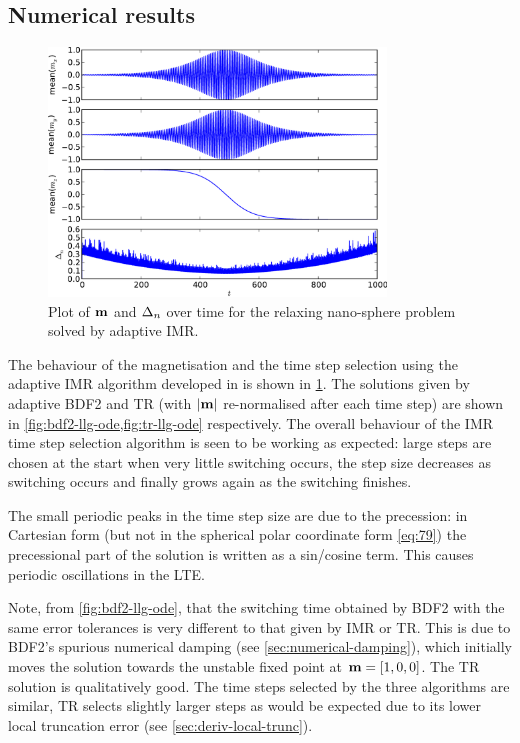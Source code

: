 \subsection{Numerical results}
\label{sec:aimr-llgode-numerical-results}

\begin{figure}
  \centering
  \includegraphics[width=0.8\textwidth]{plots/aimr-sphere-relax/imr0-meanmxsvs-meanmysvs-meanmzsvs-dtsvstimes.pdf}
  \caption{Plot of $\boldsymbol{\mathrm{m}}$ and $\Delta_{n}$ over time for the relaxing nano-sphere problem solved by adaptive IMR.}
  \label{fig:imr-llg-ode}
\end{figure}

The behaviour of the magnetisation and the time step selection using the adaptive IMR algorithm developed in  is shown in \cref{fig:imr-llg-ode}.
The solutions given by adaptive BDF2 and TR (with $\left|{\boldsymbol{\mathrm{m}}} \right|$ re-normalised after each time step)  are shown in \cref{fig:bdf2-llg-ode,fig:tr-llg-ode} respectively.
The overall behaviour of the IMR time step selection algorithm is seen to be working as expected: large steps are chosen at the start when very little switching occurs, the step size decreases as switching occurs and finally grows again as the switching finishes.

The small periodic peaks in the time step size are due to the precession: in Cartesian form (but not in the spherical polar coordinate form \cref{eq:79}) the precessional part of the solution is written as a sin/cosine term.
This causes periodic oscillations in the LTE.

Note, from \cref{fig:bdf2-llg-ode}, that the switching time obtained by BDF2 with the same error tolerances is very different to that given by IMR or TR.
This is due to BDF2's spurious numerical damping (see \cref{sec:numerical-damping}), which initially moves the solution towards the unstable fixed point at $\boldsymbol{\mathrm{m}}=[1, 0, 0]$.
The TR solution is qualitatively good.
The time steps selected by the three algorithms are similar, TR selects slightly larger steps as would be expected due to its lower local truncation error (see \cref{sec:deriv-local-trunc}).


